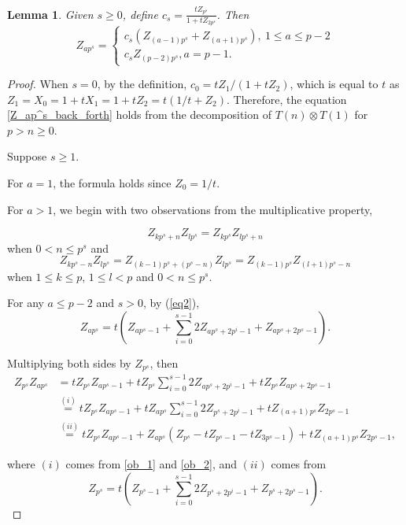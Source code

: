 \documentclass[11 pt]{amsart}
\theoremstyle{plain}
\newtheorem{lemma}[thm]{Lemma}
\theoremstyle{definition}
\theoremstyle{remark}
\def\xx{\otimes}
\begin{document}
\begin{lemma} \label{Z_p^s relations}
    Given $s \ge0$, define     $c_s= \frac{tZ_{p^s}}{1+tZ_{2p^s}}$. Then \begin{equation} \label{Z_ap^s_back_forth}
    Z_{ap^s}=\begin{cases}
        c_s (Z_{(a-1)p^s}+Z_{(a+1)p^s}),\ 1\le a \le p-2\\
        c_sZ_{(p-2)p^s}, a=p-1.
    \end{cases}        
    \end{equation}
    
\end{lemma}



\begin{proof}
When $s=0$, by the definition, $c_0=tZ_1/(1+tZ_2)$, which is equal to $t$ as $Z_1=X_0=1+tX_1=1+tZ_2=t(1/t+Z_2)$. Therefore, the equation \eqref{Z_ap^s_back_forth}
holds from the decomposition of $T(n)\xx T(1)$ for $p>n \ge 0.$

Suppose $s \ge 1$. 

For $a=1$, the formula holds since $Z_0=1/t$.

For $a>1$, we begin with two observations from the multiplicative property, 

\begin{equation} \label{ob_1}
    Z_{kp^s+n}Z_{lp^s}=Z_{kp^s}Z_{lp^s+n}
\end{equation}
when $0 < n \le p^s$ and 
\begin{equation} \label{ob_2}
    Z_{kp^s-n} Z_{lp^s}=Z_{(k-1)p^s+(p^s-n)} Z_{lp^s}=Z_{(k-1)p^s}Z_{(l+1)p^s-n}
    \end{equation}
    when $1\le k \le p$, $1 \le l <p$ and $0< n \le  p^s$.
    

For any $a \le p-2$ and $s>0$, by (\ref{eq2}), $$Z_{ap^s}=t(Z_{ap^s-1}+\sum_{i=0}^{s-1}2Z_{ap^s+2p^i-1}+Z_{ap^s+2p^s-1}).$$

Multiplying both sides by $Z_{p^s}$, then \begin{align*}
    Z_{p^s}Z_{ap^s}&=tZ_{p^s}Z_{ap^s-1}+tZ_{p^s}\sum_{i=0}^{s-1}2Z_{ap^s+2p^i-1}+tZ_{p^s}Z_{ap^s+2p^s-1}\\
    &\stackrel{(i)}{=}  tZ_{p^s}Z_{ap^s-1}+tZ_{ap^s}\sum_{i=0}^{s-1}2Z_{p^s+2p^i-1}+tZ_{(a+1)p^s}Z_{2p^s-1}\\ 
    &\stackrel{(ii)}{=}  tZ_{p^s}Z_{ap^s-1}+Z_{ap^s}(Z_{p^s}-tZ_{p^s-1}-tZ_{3p^s-1})+tZ_{(a+1)p^s}Z_{2p^s-1},
\end{align*}

where $(i)$ comes from \eqref{ob_1} and \eqref{ob_2}, and $(ii)$ comes from $$Z_{p^s}=t(Z_{p^s-1}+\sum_{i=0}^{s-1} 2Z_{p^s+2p^i-1}+Z_{p^s+2p^s-1}).$$



\end{proof}
\end{document}

